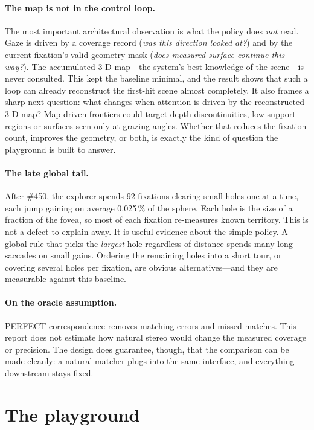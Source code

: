 \documentclass[11pt,a4paper]{article}
\newcommand{\pct}[1]{#1\,\%}
\begin{document}
\paragraph{The map is not in the control loop.} The most important architectural observation is what the policy does
\emph{not} read. Gaze is driven by a coverage record (\emph{was this direction looked at?}) and by the current
fixation's valid-geometry mask (\emph{does measured surface continue this way?}). The accumulated 3-D map---the system's
best knowledge of the scene---is never consulted. This kept the baseline minimal, and the result shows that such a
loop can already reconstruct the first-hit scene almost completely. It also frames a sharp next question: what changes
when attention is driven by the reconstructed 3-D map? Map-driven frontiers could target depth discontinuities,
low-support regions or surfaces seen only at grazing angles. Whether that reduces the fixation count, improves the
geometry, or both, is exactly the kind of question the playground is built to answer.

\paragraph{The late global tail.} After \#450, the explorer spends 92 fixations clearing small holes one at a time,
each jump gaining on average \pct{0.025} of the sphere. Each hole is the size of a fraction of the fovea, so most of
each fixation re-measures known territory. This is not a defect to explain away. It is useful evidence about the
simple policy. A global rule that picks the \emph{largest} hole regardless of distance spends many long saccades on
small gains. Ordering the remaining holes into a short tour, or covering several holes per fixation, are obvious
alternatives---and they are measurable against this baseline.

\paragraph{On the oracle assumption.} PERFECT correspondence removes matching errors and missed matches. This report
does not estimate how natural stereo would change the measured coverage or precision. The design does guarantee,
though, that the comparison can be made cleanly: a natural matcher plugs into the same interface, and everything
downstream stays fixed.

\section{The playground}\label{sec:extension}
\end{document}
